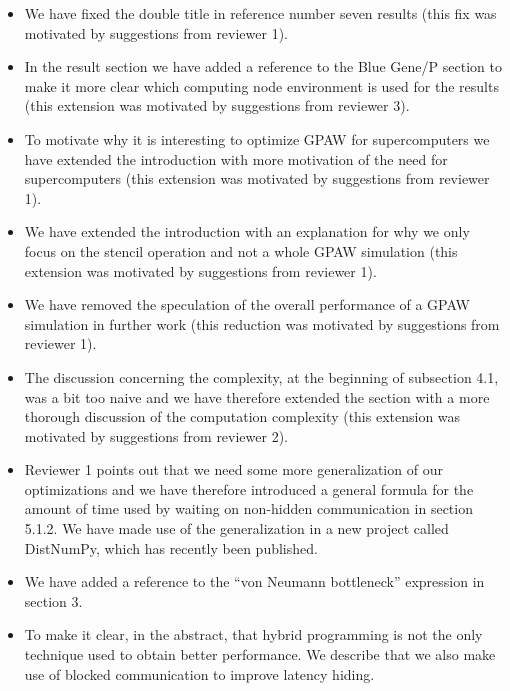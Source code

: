 \documentclass[preprint,3p,times]{elsarticle}
\begin{document}
\begin{itemize}
\item We have fixed the double title in reference number seven results (this fix was motivated by suggestions from reviewer 1).

\item In the result section we have added a reference to the Blue Gene/P section to make it more clear which computing node environment is used for the results (this extension was motivated by suggestions from reviewer 3).

\item To motivate why it is interesting to optimize GPAW for supercomputers we have extended the introduction with more motivation of the need for supercomputers (this extension was motivated by suggestions from reviewer 1).

\item We have extended the introduction with an explanation for why we only focus on the stencil operation and not a whole GPAW simulation (this extension was motivated by suggestions from reviewer 1).

\item We have removed the speculation of the overall performance of a GPAW simulation in further work (this reduction was motivated by suggestions from reviewer 1).

\item The discussion concerning the complexity, at the beginning of subsection 4.1, was a bit too naive and we have therefore extended the section with a more thorough discussion of the computation complexity (this extension was motivated by suggestions from reviewer 2).

\item Reviewer 1 points out that we need some more generalization of our optimizations and we have therefore introduced a general formula for the amount of time used by waiting on non-hidden communication in section 5.1.2. We have made use of the generalization in a new project called DistNumPy\cite{PGAS10}, which has recently been published.

\item We have added a reference to the ``von Neumann bottleneck'' expression in section 3.

\item To make it clear, in the abstract, that hybrid programming is not the only technique used to obtain better performance. We describe that we also make use of blocked communication to improve latency hiding.
\end{itemize}




\end{document}
